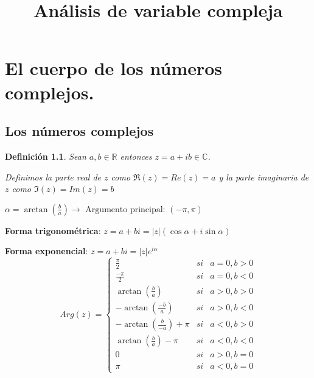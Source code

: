 \documentclass[10pt]{book}
\title{Análisis de variable compleja}
\newtheorem{defi}{Definición}[chapter]
\newcommand{\R}{\mathbb{R}}
\newcommand{\C}{\mathbb{C}}
\begin{document}
\maketitle
\tableofcontents
\begin{comment}
\chapter*{Preámbulo}
\addcontentsline{toc}{chapter}{Preámbulo}
Estos apuntes están destinados a complementar los apuntes tomados por
los estudiantes de la asignatura homónima perteneciente al tercer año del
Grado en Física de la Universidad de Alicante.
Es un texto realizado fundamentalmente a partir de las notas tomadas
durante las lecciones impartidas por el profesor Juan Matías Sepulcre Martínez, del departamento
de Análisis Matemático, durante el curso académico 2021-22022, destinado exclusivamente a estudiantes y sin ánimo de lucro.
No está exento de erratas. La edición de estos apuntes se remite a la fecha de compilación que aparece en la portada. El último tema es el que menos horas hemos echado por falta de las mismas. 

Para obtener una copia del código fuente o para comunicar posibles erratas, o colaborar de cualquier forma para mejorar estos apuntes se ruega contactar a: {\color{blue}\href{mailto:orm13@alu.ua.es?subject=Apuntes análisis complejo}{orm13@alu.ua.es}}

\end{comment}
\chapter{El cuerpo de los números complejos.}
\section{Los números complejos}

\begin{defi}
Sean $a,b \in\R$ entonces $z = a + ib \in \C$.

Definimos la parte real de $z$ como $\Re(z) = Re(z) = a$ y la parte imaginaria de $z$ como $\Im(z) = Im(z) = b$
\end{defi}


 $\alpha = \arctan (\frac{b}{a}) \longrightarrow \text{ Argumento principal: } (-\pi,\pi)$
 
 \textbf{Forma trigonométrica}: $z = a+bi = |z|(\cos \alpha + i\sin \alpha)$
 
 \textbf{Forma exponencial}: $z = a+bi = |z|e^{i\alpha}$
$$ 
	Arg(z)= \left\{ \begin{array}{lcc}
	\frac{\pi}{2} & si & a=0,b>0 \\
	\frac{-\pi}{2} & si & a=0,b<0\\
	\arctan (\frac{b}{a}) & si & a>0,b>0\\
	-\arctan (\frac{-b}{a}) & si & a>0, b<0\\
	-\arctan (\frac{b}{-a}) + \pi & si &  a<0,b>0\\
	\arctan (\frac{b}{a}) - \pi & si & a<0,b<0\\
	0 & si & a>0,b=0\\
	\pi & si & a<0, b=0
	\end{array}
\right.  
$$
\end{document}
